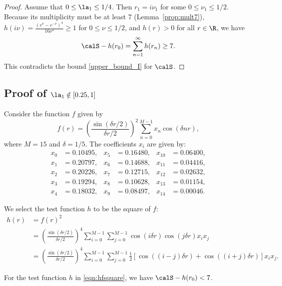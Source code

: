\begin{proof}
Assume that $0\leq \la_1 \leq 1/4$.
Then $r_1 = i\nu_1$ for some $0\leq \nu_1 \leq 1/2$.
Because its multiplicity must be at least 7 (Lemma~\ref{prop:mult7}), $h(i\nu)=\frac{\left(e^{\nu }-e^{-\nu }\right)^4}{16 \nu ^4}\geq 1$ for $0\leq \nu \leq 1/2$, and $h(r)>0$ for all $r\in \R$, we have 
\[
\calS-h(r_0) = \sum_{n=1}^{\infty} h(r_n) \geq 7.
\]
This contradicts the bound \eqref{upper_bound_I} for $\calS$.
\end{proof}


\subsection{Proof of $\la_1 \notin [0.25, 1]$}
\label{subsec:subinterval2}
Consider the function $f$ given by
\begin{equation}\label{eqn:hsqrth}
f(r)=\left(\frac{\sin(\delta r / 2)}{\delta r / 2}\right)^{2} \sum_{n=0}^{M-1} x_{n} \cos(\delta n r),
\end{equation}
where $M=15$ and $\delta = 1/5$.
The coefficients $x_i$ are given by:
\begin{align*}
x_{0} & = 0.10495, & x_{5} & = 0.16480, & x_{10} & = 0.06400, \\
x_{1} & = 0.20797, & x_{6} & = 0.14688, & x_{11} & = 0.04416, \\
x_{2} & = 0.20226, & x_{7} & = 0.12715, & x_{12} & = 0.02632, \\
x_{3} & = 0.19294, & x_{8} & = 0.10628, & x_{13} & = 0.01154, \\
x_{4} & = 0.18032, & x_{9} & = 0.08497, & x_{14} & = 0.00046.
\end{align*}

We select the test function $h$ to be the square of $f$:
\begin{align}
h(r) & = f(r)^{2} \label{eqn:hfsquare} \\
     & = \left(\frac{\sin(\delta r / 2)}{\delta r / 2}\right)^{4} \sum_{{i=0}}^{{M-1}} \sum_{{j=0}}^{{M-1}}     
     \cos(i \delta r) \cos(j \delta r) x_{i} x_{j} \nonumber \\
     & = \left(\frac{\sin(\delta r / 2)}{\delta r / 2}\right)^{4}\sum_{{i=0}}^{{M-1}} \sum_{{j=0}}^{{M-1}}     
     \frac{1}{2} \left[ \cos((i-j) \delta r) + \cos((i+j) \delta r) \right]x_{i} x_{j}. \nonumber
\end{align}

\begin{prop}\label{prop:upper_bound_II}
For the test function $h$ in \eqref{eqn:hfsquare}, we have $\calS-h(r_0)<7$.
\end{prop}

